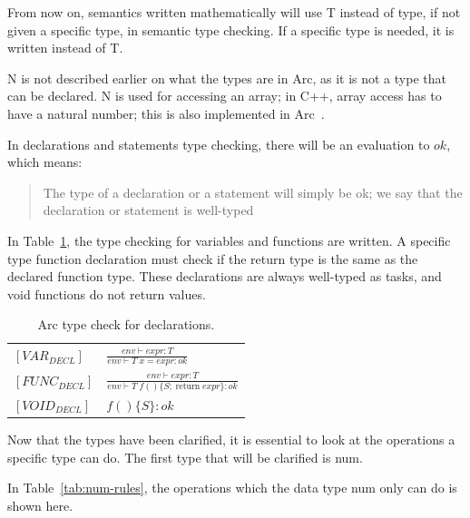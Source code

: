 From now on, semantics written mathematically will use T instead of type, if not given a specific type, in semantic type checking. If a specific type is needed, it is written instead of T.

N is not described earlier on what the types are in Arc, as it is not a type that can be declared. N is used for accessing an array; in C++, array access has to have a natural number; this is also implemented in Arc~\cite{cppreferenceDataTypes}.



In declarations and statements type checking, there will be an evaluation to $ok$, which means:

\blockcquote{Huttel2010}{The type of a declaration or a statement will simply be ok; we say that the declaration or statement is well-typed}

In Table~\ref{tab:DeclTypeCheck}, the type checking for variables and functions are written. A specific type function declaration must check if the return type is the same as the declared function type. These declarations are always well-typed as tasks, and void functions do not return values.


\begin{table}[htb!]
    \centering
    \begin{tabular}{ll}
        \toprule
        $[VAR_{DECL}] $  & $\frac{env \vdash expr : T}{env \vdash T \;x = expr : ok}$                            \\  [12pt]
        $[FUNC_{DECL}] $ & $\frac{env \vdash expr : T}{env \vdash T \;f() \{S; \;\text{return} \; expr\}  : ok}$ \\  [12pt]
        $[VOID_{DECL}] $ & $f()\{S\}  : ok$                                                                      \\
        \bottomrule
    \end{tabular}
    \caption{Arc type check for declarations.}
    \label{tab:DeclTypeCheck}
\end{table}


Now that the types have been clarified, it is essential to look at the operations a specific type can do. The first type that will be clarified is num.

In Table~\ref{tab:num-rules}, the operations which the data type num only can do is shown here.


